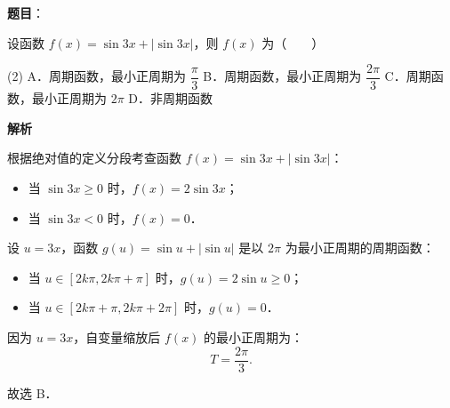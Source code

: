 \begin{answer}

\textbf{题目}：

设函数 $f(x) = \sin 3x + |\sin 3x|$，则 $f(x)$ 为\mbox{（　　）}

\begin{gkopts}(2)
\task A．周期函数，最小正周期为 $\dfrac{\pi}{3}$
\task B．周期函数，最小正周期为 $\dfrac{2\pi}{3}$
\task C．周期函数，最小正周期为 $2\pi$
\task D．非周期函数
\end{gkopts}

\textbf{解析}

根据绝对值的定义分段考查函数 $f(x) = \sin 3x + |\sin 3x|$：
\begin{itemize}
\item 当 $\sin 3x \geqslant 0$ 时，$f(x) = 2\sin 3x$；
\item 当 $\sin 3x < 0$ 时，$f(x) = 0$．
\end{itemize}
设 $u = 3x$，函数 $g(u) = \sin u + |\sin u|$ 是以 $2\pi$ 为最小正周期的周期函数：
\begin{itemize}
\item 当 $u \in [2k\pi, 2k\pi + \pi]$ 时，$g(u) = 2\sin u \geqslant 0$；
\item 当 $u \in [2k\pi + \pi, 2k\pi + 2\pi]$ 时，$g(u) = 0$．
\end{itemize}
因为 $u = 3x$，自变量缩放后 $f(x)$ 的最小正周期为：
\nopagebreak[4]
\[
T = \dfrac{2\pi}{3}.
\]

故选 B．


\end{answer}

